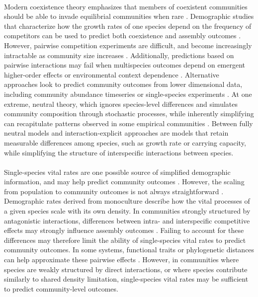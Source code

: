 \paragraph*{} Modern coexistence theory emphasizes that members of coexistent communities should be able to invade equilibrial communities when rare \parencite{chesson2000mechanisms, hillerislambers2012rethinking}. Demographic studies that characterize how the growth rates of one species depend on the frequency of competitors can be used to predict both coexistence and assembly outcomes \parencite{wills1997strong, hille2002density, harpole2007frequency}. However, pairwise competition experiments are difficult, and become increasingly intractable as community size increases \parencite{maurer1999untangling}. Additionally, predictions based on pairwise interactions may fail when multispecies outcomes depend on emergent higher-order effects or environmental context dependence \parencite{chesson2018updates,lee2023resource, miller2025multispecies}. Alternative approaches look to predict community outcomes from lower dimensional data, including community abundance timeseries \parencite{carrara2015inferring} or single-species experiments \parencite{nestor2023interactions}. At one extreme, neutral theory, which ignores species-level differences and simulates community composition through stochastic processes, while inherently simplifying can recapitulate patterns observed in some empirical communities \parencite{Hubbell2001, woodcock2007neutral, oficteru2010combined}. Between fully neutral models and interaction-explicit approaches are models that retain measurable differences among species, such as growth rate or carrying capacity, while simplifying the structure of interspecific interactions between species. 

\paragraph*{} Single-species vital rates are one possible source of simplified demographic information, and may help predict community outcomes \parencite{ram2019predicting, nestor2023interactions}. However, the scaling from population to community outcomes is not always straightforward \parencite{khristich2025empirical}. Demographic rates derived from monoculture describe how the vital processes of a given species scale with its own density. In communities strongly structured by antagonistic interactions, differences between intra- and interspecific competitive effects may strongly influence assembly outcomes \parencite{hillerislambers2012rethinking,barabas2016effect, chesson2018updates}. Failing to account for these differences may therefore limit the ability of single-species vital rates to predict community outcomes. In some systems, functional traits or phylogenetic distances can help approximate these pairwise effects \parencite{cadotte2013ecology, e2023phylogenetic}. However, in communities where species are weakly structured by direct interactions, or where species contribute similarly to shared density limitation, single-species vital rates may be sufficient to predict community-level outcomes. 

